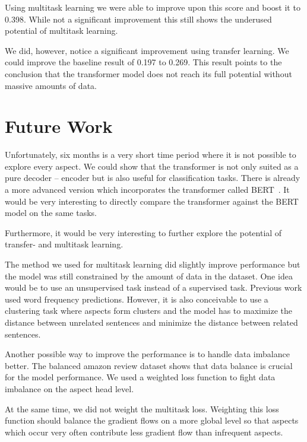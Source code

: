 Using multitask learning we were able to improve upon this score and boost it to 0.398. While not a significant improvement this still shows the underused potential of multitask learning.
\medskip

We did, however, notice a significant improvement using transfer learning. We could improve the baseline result of 0.197 to 0.269. This result points to the conclusion that the transformer model does not reach its full potential without massive amounts of data.


\section{Future Work}

Unfortunately, six months is a very short time period where it is not possible to explore every aspect. We could show that the transformer is not only suited as a pure decoder -- encoder but is also useful for classification tasks. There is already a more advanced version which incorporates the transformer called BERT~\cite{Devlin2018a}. It would be very interesting to directly compare the transformer against the BERT model on the same tasks.
\medskip

Furthermore, it would be very interesting to further explore the potential of transfer- and multitask learning.
\smallskip

The method we used for multitask learning did slightly improve performance but the model was still constrained by the amount of data in the dataset. One idea would be to use an unsupervised task instead of a supervised task. Previous work used word frequency predictions. However, it is also conceivable to use a clustering task where aspects form clusters and the model has to maximize the distance between unrelated sentences and minimize the distance between related sentences.
\medskip

Another possible way to improve the performance is to handle data imbalance better. The balanced amazon review dataset shows that data balance is crucial for the model performance. We used a weighted loss function to fight data imbalance on the aspect head level.
\smallskip

At the same time, we did not weight the multitask loss. Weighting this loss function should balance the gradient flows on a more global level so that aspects which occur very often contribute less gradient flow than infrequent aspects.